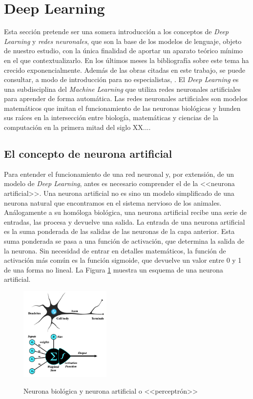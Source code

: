 \section{Deep Learning}

Esta sección pretende ser una somera introducción a los conceptos de \textit{Deep Learning} y \textit{redes neuronales}, que son la base de los modelos de lenguaje, objeto de nuestro estudio, con la única finalidad de aportar un aparato teórico mínimo en el que contextualizarlo. En los últimos meses la bibliografía sobre este tema ha crecido exponencialmente. Además de las obras citadas en este trabajo, se puede consultar, a modo de introducción para no especialistas, \cite{BeginnerGuideNeural}. El \textit{Deep Learning} es una subdisciplina del \textit{Machine Learning} que utiliza redes neuronales artificiales para aprender de forma automática. Las redes neuronales artificiales son modelos matemáticos que imitan el funcionamiento de las neuronas biológicas y hunden sus raíces en la intersección entre biología, matemáticas y ciencias de la computación en la primera mitad del siglo XX....

\subsection{El concepto de neurona artificial}

Para entender el funcionamiento de una red neuronal y, por extensión, de un modelo de \textit{Deep Learning}, antes es necesario comprender el de la <<neurona artificial>>. Una neurona artificial no es sino un modelo simplificado de una neurona natural que encontramos en el sistema nervioso de los animales. Análogamente a su homóloga biológica, una neurona artificial recibe una serie de entradas, las procesa y devuelve una salida. La entrada de una neurona artificial es la suma ponderada de las salidas de las neuronas de la capa anterior. Esta suma ponderada se pasa a una función de activación, que determina la salida de la neurona. Sin necesidad de entrar en detalles matemáticos, la función de activación más común es la función sigmoide, que devuelve un valor entre 0 y 1 de una forma no lineal. La Figura \ref{fig:neurona_artificial_natural} muestra un esquema de una neurona artificial. 

\begin{figure}[h]
    \caption[Neurona biológica y neurona artificial o <<perceptrón>>]{Neurona biológica y neurona artificial o <<perceptrón>>}
    \centering
    \includegraphics[width=0.4\textwidth]{./figuras/perceptron_with_neuron.png}
    \label{fig:neurona_artificial_natural}
\end{figure}


